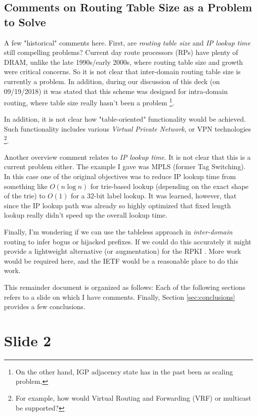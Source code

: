 \documentclass[11pt, oneside]{article}   	%
\begin{document}
\subsection{Comments on Routing Table Size as a Problem to Solve}
\label{subsec:table_size}

A few "historical" comments here. First, are \emph{routing table size} and \emph{IP lookup time} still compelling problems? Current day route processors (RPs) have plenty of DRAM, 
unlike the late 1990s/early 2000s, where routing table size and growth were critical concerns. So it is not clear that inter-domain routing table size is currently a problem. In addition, 
during our discussion of this deck (on 09/19/2018) it was stated that this scheme was designed for intra-domain routing, where table size really hasn't been a problem \footnote{On 
the other hand, IGP adjacency state has in the past been
as scaling problem.}.

\bigskip
\noindent
In addition, it is not clear how "table-oriented" functionality would be achieved. Such functionality includes various \emph{Virtual Private Network}, or VPN technologies \footnote{For example, how
would Virtual Routing and Forwarding (VRF) or multicast be supported?}.

\bigskip
\noindent
Another overview comment relates to \emph{IP lookup time}. It is not clear that this is a current problem either. The example I gave was MPLS (former Tag Switching). In this case one of the 
original objectives was to reduce IP lookup time from something like $O(n \log n)$ for trie-based lookup (depending on the exact shape of the trie)  to $O(1)$ for a 32-bit label lookup. It was 
learned, however, that since the IP lookup path was already so highly optimized that fixed length lookup really didn't speed up the overall lookup time.  

\bigskip
\noindent
Finally, I'm wondering if we can use the tableless approach in \emph{inter-domain} routing to infer bogus or hijacked prefixes. If we could do this accurately it might provide a 
lightweight alternative (or augmentation) for the RPKI \cite{rfc6810}. More work would be required here, and the IETF would be a reasonable place to do this work.

\bigskip
\noindent
This remainder document is organized as follows: Each of the following sections refers to a slide on which I have comments. Finally, Section \ref{sec:conclusions} provides a few conclusions.

\section{Slide 2}
\label{sec:slide2}
\end{document}
